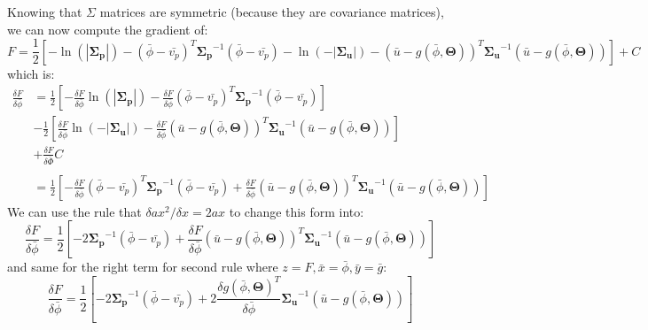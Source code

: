 Knowing that $\Sigma$ matrices are symmetric (because they are covariance matrices), we can now compute the gradient of:
$$
F = \frac{1}{2}
\left[
- \ln (|\boldsymbol{\Sigma_p}|) -
(\bar{\phi} - \bar{v_p})^T \boldsymbol{\Sigma_p}^{-1}  (\bar{\phi} - \bar{v_p}) -
\ln (-|\boldsymbol{\Sigma_u}|) -
(\bar{u} - g(\bar{\phi}, \boldsymbol{\Theta}))^T \boldsymbol{\Sigma_u}^{-1}  (\bar{u} - g(\bar{\phi}, \boldsymbol{\Theta}))
\right]
+C
$$
which is:
\begin{equation*}
    \begin{aligned}
        \frac{\delta F}{\delta \bar{\phi}} &=
        \frac{1}{2}
        \left[
        - \frac{\delta F}{\delta \bar{\phi}} \ln (|\boldsymbol{\Sigma_p}|) -
        \frac{\delta F}{\delta \bar{\phi}}(\bar{\phi} - \bar{v_p})^T \boldsymbol{\Sigma_p}^{-1}  (\bar{\phi} - \bar{v_p}) \right] \\
        &-
        \frac{1}{2}
        \left[
        \frac{\delta F}{\delta \bar{\phi}}\ln (-|\boldsymbol{\Sigma_u}|) -
        \frac{\delta F}{\delta \bar{\phi}}(\bar{u} - g(\bar{\phi}, \boldsymbol{\Theta}))^T \boldsymbol{\Sigma_u}^{-1}  (\bar{u} - g(\bar{\phi}, \boldsymbol{\Theta}))
        \right]\\
        &+ \frac{\delta F}{\delta \bar{\Phi}}C \\ \\
        &=
        \frac{1}{2}
        \left[-
        \frac{\delta F}{\delta \bar{\phi}}(\bar{\phi} - \bar{v_p})^T \boldsymbol{\Sigma_p}^{-1}  (\bar{\phi} - \bar{v_p}) +
        \frac{\delta F}{\delta \bar{\phi}}(\bar{u} - g(\bar{\phi}, \boldsymbol{\Theta}))^T \boldsymbol{\Sigma_u}^{-1}  (\bar{u} - g(\bar{\phi}, \boldsymbol{\Theta}))
        \right]
    \end{aligned}
\end{equation*}
We can use the rule that $\delta ax^2 / \delta x = 2ax$ to change this form into:
$$
\frac{\delta F}{\delta \bar{\phi}} =
\frac{1}{2}
\left[-
2 \boldsymbol{\Sigma_p}^{-1}  (\bar{\phi} - \bar{v_p}) +
\frac{\delta F}{\delta \bar{\phi}}(\bar{u} - g(\bar{\phi}, \boldsymbol{\Theta}))^T \boldsymbol{\Sigma_u}^{-1}  (\bar{u} - g(\bar{\phi}, \boldsymbol{\Theta}))
\right]
$$
and same for the right term for second rule where $z = F, \bar{x} = \bar{\phi}, \bar{y} = \bar{g}$:
$$
\frac{\delta F}{\delta \bar{\phi}} =
\frac{1}{2}
\left[-
2 \boldsymbol{\Sigma_p}^{-1}  (\bar{\phi} - \bar{v_p}) +
2\frac{\delta g(\bar{\phi}, \boldsymbol{\Theta})^T}{\delta \bar{\phi}}\boldsymbol{\Sigma_u}^{-1}  (\bar{u} - g(\bar{\phi}, \boldsymbol{\Theta}))
\right]
$$

